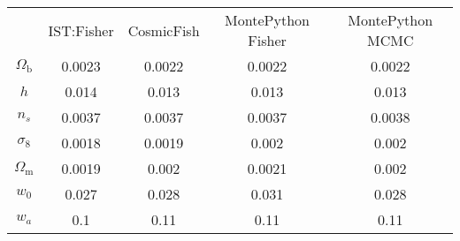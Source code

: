 \begin{table}
\centering
\begin{tabular}{|c|c|c|c|c|}
 & IST:Fisher & CosmicFish & MontePython Fisher & MontePython MCMC \\
$\Omega_\mathrm{b}$ & 0.0023 & 0.0022 & 0.0022 & 0.0022 \\
$h$ & 0.014 & 0.013 & 0.013 & 0.013 \\
$n_s$ & 0.0037 & 0.0037 & 0.0037 & 0.0038 \\
$\sigma_8$ & 0.0018 & 0.0019 & 0.002 & 0.002 \\
$\Omega_\mathrm{m}$ & 0.0019 & 0.002 & 0.0021 & 0.002 \\
$w_0$ & 0.027 & 0.028 & 0.031 & 0.028 \\
$w_a$ & 0.1 & 0.11 & 0.11 & 0.11 \\
\end{tabular}
\end{table}
